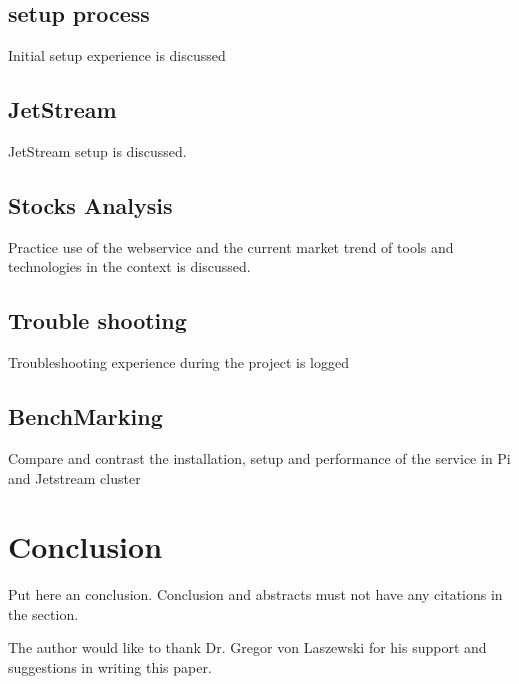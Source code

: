 \subsection{setup process}
Initial setup experience is discussed

\subsection{JetStream}
JetStream setup is discussed.

\subsection{Stocks Analysis}
Practice use of the webservice and the current market trend of tools and technologies in the context is discussed.

\subsection{Trouble shooting}
Troubleshooting experience during the project is logged

\subsection{BenchMarking}
Compare and contrast the installation, setup and performance of the service in Pi and Jetstream cluster


\section{Conclusion}

Put here an conclusion. Conclusion and abstracts must not have any
citations in the section.


\begin{acks}
The author would like to thank Dr. Gregor von Laszewski for his support and 
suggestions in writing this paper.
\end{acks}






